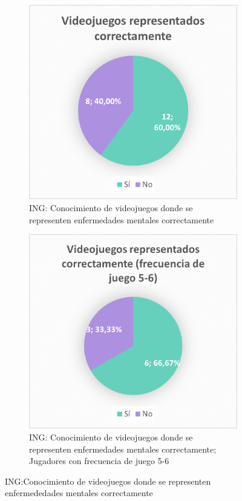 \documentclass[12pt, a4paper,twoside,titlepage]{book}
\begin{document}
\begin{figure}
\centering
\begin{subfigure}{.5\textwidth}
  \centering
  \includegraphics[width=.95\linewidth]{ANEXO ING/15AnexINGCorr}
  \caption{ING: Conocimiento de videojuegos donde se representen enfermedades mentales correctamente}
\end{subfigure}%
\begin{subfigure}{.5\textwidth}
  \centering
  \includegraphics[width=.95\linewidth]{ANEXO ING/16AnexINGCorr56}
  \caption{ING: Conocimiento de videojuegos donde se representen enfermedades mentales correctamente; Jugadores con frecuencia de juego 5-6}
\end{subfigure}
\caption{ING:Conocimiento de videojuegos donde se representen enfermededades mentales correctamente}
\label{fig:INGCorr}
\end{figure}
\end{document}
